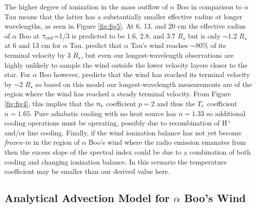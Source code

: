 \documentclass[iop]{emulateapj}
\begin{document}
The higher degree of ionization in the mass outflow of $\alpha$ Boo in comparison to $\alpha$ Tau means that the latter has a substantially smaller effective radius at longer wavelengths, as seen in Figure \ref{fig:fig5}. At 6, 13, and 20 cm the effective radius of $\alpha$ Boo at $\tau _{\rm{rad}}$=1/3 is predicted to be 1.6, 2.8, and 3.7 $R_{\star}$ but is only $\sim$1.2 $R_{\star}$ at 6 and 13 cm for $\alpha$ Tau. \cite{1998ApJ...503..396R} predict that $\alpha$ Tau's wind reaches $\sim$80\% of its terminal velocity by 3 $R_{\star}$, but even our longest-wavelength observations are highly unlikely to sample the wind outside the lower velocity layers closer to the star. For $\alpha$ Boo however, \cite{1985pssl.proc..351D} predicts that the wind has reached its terminal velocity by $\sim$2 $R_{\star}$ so based on this model our longest-wavelength measurements are of the region where the wind has reached a steady terminal velocity. From Figure \ref{fig:fig4}, this implies that the $n_{\rm{e}}$ coefficient $p=2$ and thus the $T_{\rm{e}}$ coefficient $n=1.65$. Pure adiabatic cooling with no heat source has $n=1.33$ so additional cooling operations must be operating, possibly due to recombination of H$^{+}$ and/or line cooling. Finally, if the wind ionization balance has not yet become \textit{frozen-in} in the region of $\alpha$ Boo's wind where the radio emission emanates from then the excess slope of the spectral index could be due to a combination of both cooling and changing ionization balance. In this scenario the temperature coefficient may be smaller than our derived value here.

\subsection{Analytical Advection Model for $\alpha$ Boo's Wind} \label{disc:disc4}
\end{document}
